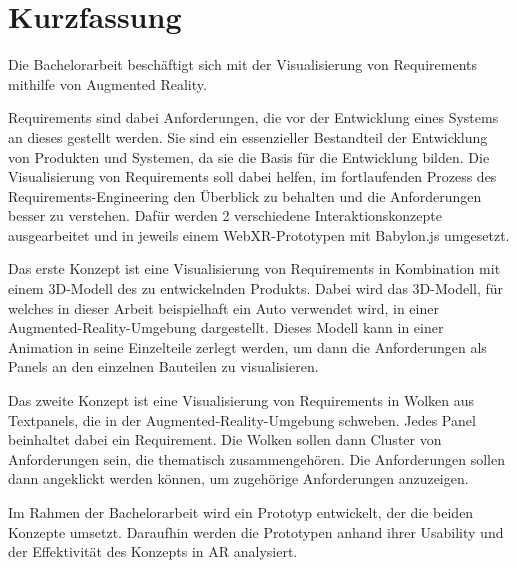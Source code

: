 \chapter{Kurzfassung}

Die Bachelorarbeit beschäftigt sich mit der Visualisierung von Requirements mithilfe von Augmented Reality.

Requirements sind dabei Anforderungen, die vor der Entwicklung eines Systems an dieses gestellt werden.
Sie sind ein essenzieller Bestandteil der Entwicklung von Produkten und Systemen, da sie die Basis für die Entwicklung bilden.
Die Visualisierung von Requirements soll dabei helfen, im fortlaufenden Prozess des Requirements-Engineering den Überblick zu behalten und die Anforderungen besser zu verstehen.
Dafür werden 2 verschiedene Interaktionskonzepte ausgearbeitet und in jeweils einem WebXR-Prototypen mit Babylon.js umgesetzt.

Das erste Konzept ist eine Visualisierung von Requirements in Kombination mit einem 3D-Modell des zu entwickelnden Produkts.
Dabei wird das 3D-Modell, für welches in dieser Arbeit beispielhaft ein Auto verwendet wird, in einer Augmented-Reality-Umgebung dargestellt.
Dieses Modell kann in einer Animation in seine Einzelteile zerlegt werden, um dann die Anforderungen als Panels an den einzelnen Bauteilen zu visualisieren.

Das zweite Konzept ist eine Visualisierung von Requirements in Wolken aus Textpanels, die in der Augmented-Reality-Umgebung schweben.
Jedes Panel beinhaltet dabei ein Requirement.
Die Wolken sollen dann Cluster von Anforderungen sein, die thematisch zusammengehören.
Die Anforderungen sollen dann angeklickt werden können, um zugehörige Anforderungen anzuzeigen.


Im Rahmen der Bachelorarbeit wird ein Prototyp entwickelt, der die beiden Konzepte umsetzt.
Daraufhin werden die Prototypen anhand ihrer Usability und der Effektivität des Konzepts in AR analysiert.